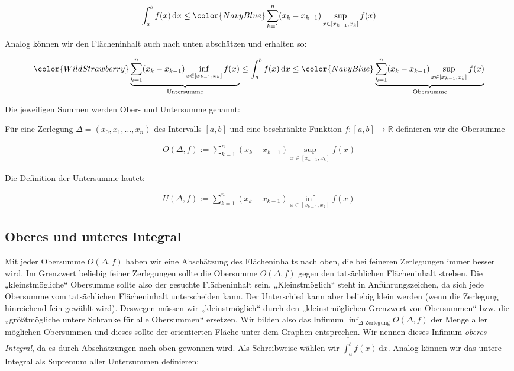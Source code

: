 \documentclass[fontsize=9pt,
               parskip=half-,
               DIV=14,
               listof=chapterentry,
               tocflat]{scrbook}
\begin{document}
\begin{align*}
\int _{a}^{b}f(x)\,\mathrm {d} x\leq {\color {NavyBlue}\sum _{k=1}^{n}(x_{k}-x_{k-1})\sup _{x\in [x_{k-1},x_{k}]}f(x)}
\end{align*}

Analog können wir den Flächeninhalt auch nach unten abschätzen und erhalten so:

\begin{align*}
{\color {WildStrawberry}\underbrace {\sum _{k=1}^{n}(x_{k}-x_{k-1})\inf _{x\in [x_{k-1},x_{k}]}f(x)} _{\text{Untersumme}}}\leq \int _{a}^{b}f(x)\,\mathrm {d} x\leq {\color {NavyBlue}\underbrace {\sum _{k=1}^{n}(x_{k}-x_{k-1})\sup _{x\in [x_{k-1},x_{k}]}f(x)} _{\text{Obersumme}}}
\end{align*}

Die jeweiligen Summen werden Ober- und Untersumme genannt:

\begin{definition*}
Für eine Zerlegung $\Delta =(x_{0},x_{1},\ldots ,x_{n})$ des Intervalls $[a,b]$ und eine beschränkte Funktion $f:[a,b]\to \mathbb {R} $ definieren wir die Obersumme

\begin{align*}
O(\Delta ,f):=\sum _{k=1}^{n}(x_{k}-x_{k-1})\sup _{x\in [x_{k-1},x_{k}]}f(x)
\end{align*}

Die Definition der Untersumme lautet:

\begin{align*}
U(\Delta ,f):=\sum _{k=1}^{n}(x_{k}-x_{k-1})\inf _{x\in [x_{k-1},x_{k}]}f(x)
\end{align*}

\end{definition*}

\subsection{Oberes und unteres Integral}

Mit jeder Obersumme $O(\Delta ,f)$ haben wir eine Abschätzung des Flächeninhalts nach oben, die bei feineren Zerlegungen immer besser wird. Im Grenzwert beliebig feiner Zerlegungen sollte die Obersumme $O(\Delta ,f)$ gegen den tatsächlichen Flächeninhalt streben. Die „kleinstmögliche“ Obersumme sollte also der gesuchte Flächeninhalt sein. „Kleinstmöglich“ steht in Anführungszeichen, da sich jede Obersumme vom tatsächlichen Flächeninhalt unterscheiden kann. Der Unterschied kann aber beliebig klein werden (wenn die Zerlegung hinreichend fein gewählt wird). Deswegen müssen wir „kleinstmöglich“ durch den „kleinstmöglichen Grenzwert von Obersummen“ bzw. die „größtmögliche untere Schranke für alle Obersummen“ ersetzen. Wir bilden also das Infimum $\inf _{\Delta {\text{ Zerlegung}}}O(\Delta ,f)$ der Menge aller möglichen Obersummen und dieses sollte der orientierten Fläche unter dem Graphen entsprechen. Wir nennen dieses Infimum \emph{oberes Integral}, da es durch Abschätzungen nach oben gewonnen wird. Als Schreibweise wählen wir ${\overline {\int _{a}^{b}}}f(x)\,\mathrm {d} x$. Analog können wir das untere Integral als Supremum aller Untersummen definieren:
\end{document}
